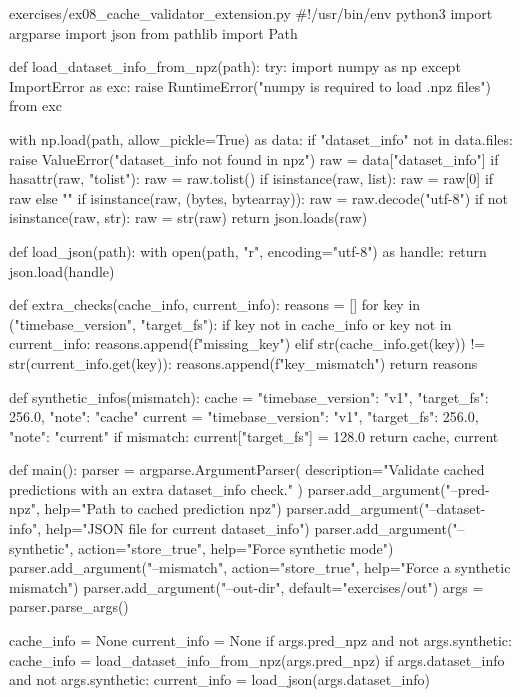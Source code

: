 \documentclass[11pt,openany]{book}
\begin{document}
\begin{filecontents*}{exercises/ex08_cache_validator_extension.py}
#!/usr/bin/env python3
import argparse
import json
from pathlib import Path


def load_dataset_info_from_npz(path):
    try:
        import numpy as np
    except ImportError as exc:
        raise RuntimeError("numpy is required to load .npz files") from exc

    with np.load(path, allow_pickle=True) as data:
        if "dataset_info" not in data.files:
            raise ValueError("dataset_info not found in npz")
        raw = data["dataset_info"]
        if hasattr(raw, "tolist"):
            raw = raw.tolist()
        if isinstance(raw, list):
            raw = raw[0] if raw else ""
        if isinstance(raw, (bytes, bytearray)):
            raw = raw.decode("utf-8")
        if not isinstance(raw, str):
            raw = str(raw)
        return json.loads(raw)


def load_json(path):
    with open(path, "r", encoding="utf-8") as handle:
        return json.load(handle)


def extra_checks(cache_info, current_info):
    reasons = []
    for key in ("timebase_version", "target_fs"):
        if key not in cache_info or key not in current_info:
            reasons.append(f"missing_{key}")
        elif str(cache_info.get(key)) != str(current_info.get(key)):
            reasons.append(f"{key}_mismatch")
    return reasons


def synthetic_infos(mismatch):
    cache = {"timebase_version": "v1", "target_fs": 256.0, "note": "cache"}
    current = {"timebase_version": "v1", "target_fs": 256.0, "note": "current"}
    if mismatch:
        current["target_fs"] = 128.0
    return cache, current


def main():
    parser = argparse.ArgumentParser(
        description="Validate cached predictions with an extra dataset_info check."
    )
    parser.add_argument("--pred-npz", help="Path to cached prediction npz")
    parser.add_argument("--dataset-info", help="JSON file for current dataset_info")
    parser.add_argument("--synthetic", action="store_true", help="Force synthetic mode")
    parser.add_argument("--mismatch", action="store_true", help="Force a synthetic mismatch")
    parser.add_argument("--out-dir", default="exercises/out")
    args = parser.parse_args()

    cache_info = None
    current_info = None
    if args.pred_npz and not args.synthetic:
        cache_info = load_dataset_info_from_npz(args.pred_npz)
    if args.dataset_info and not args.synthetic:
        current_info = load_json(args.dataset_info)


\end{filecontents*}
\end{document}
